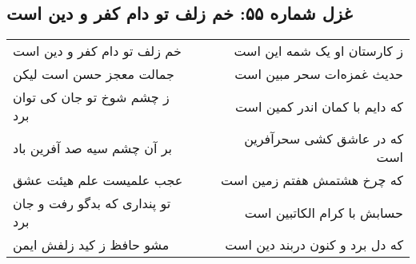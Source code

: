 \begin{center}
\section*{غزل شماره ۵۵: خم زلف تو دام کفر و دین است}
\label{sec:sh055}
\begin{longtable}{l p{0.5cm} r}
خم زلف تو دام کفر و دین است
&&
ز کارستان او یک شمه این است
\\
جمالت معجز حسن است لیکن
&&
حدیث غمزه‌ات سحر مبین است
\\
ز چشم شوخ تو جان کی توان برد
&&
که دایم با کمان اندر کمین است
\\
بر آن چشم سیه صد آفرین باد
&&
که در عاشق کشی سحرآفرین است
\\
عجب علمیست علم هیئت عشق
&&
که چرخ هشتمش هفتم زمین است
\\
تو پنداری که بدگو رفت و جان برد
&&
حسابش با کرام الکاتبین است
\\
مشو حافظ ز کید زلفش ایمن
&&
که دل برد و کنون دربند دین است
\\
\end{longtable}
\end{center}
